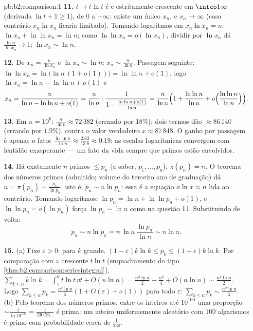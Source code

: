 \begin{solution}{pb:b2:comparison:1}
\textbf{11.} $t \mapsto t\ln t$ é  e estritamente
crescente em $\intco1\infty$ (derivada $\ln t + 1 \geq 1$),
de $0$ a $+\infty$: existe um único $x_n$, e $x_n \to
\infty$ (caso contrário $x_n\ln x_n$ ficaria limitado). Tomando
logaritmos em $x_n\ln x_n = n$: $\ln x_n + \ln\ln x_n = \ln n$;
como $\ln\ln x_n = o(\ln x_n)$, dividir por $\ln x_n$ dá
$\frac{\ln n}{\ln x_n} \to 1$: $\ln x_n \sim \ln n$.

\textbf{12.} De $x_n = \frac{n}{\ln x_n}$ e $\ln x_n \sim
\ln n$: $x_n \sim \frac{n}{\ln n}$. Passagem seguinte: $\ln\ln x_n =
\ln\bigl(\ln n\,(1 + o(1))\bigr) = \ln\ln n + o(1)$, logo $\ln
x_n = \ln n - \ln\ln n + o(1)$ e
\[
x_n = \frac{n}{\ln n - \ln\ln n + o(1)}
= \frac{n}{\ln n}\cdot\frac{1}{1 - \frac{\ln\ln n +
o(1)}{\ln n}}
= \frac{n}{\ln n}\Bigl(1 + \frac{\ln\ln n}{\ln n} +
o\Bigl(\frac{\ln\ln n}{\ln n}\Bigr)\Bigr).
\]

\textbf{13.} Em $n = 10^6$: $\frac{n}{\ln n} \approx 72\,382$
(errando por $18\%$); dois termos dão $\approx 86\,140$ (errando por
$1.9\%$), contra o valor verdadeiro $x \approx 87\,848$. O ganho por
passagem é apenas o fator $\frac{\ln\ln n}{\ln n} \approx
\frac{2.63}{13.8} \approx 0.19$: as escalas logarítmicas convergem
com lentidão exasperante --- um fato da vida sempre que primos estão
envolvidos.

\textbf{14.} Há exatamente $n$ primos $\leq p_n$ (a saber,
$p_1, \dots, p_n$): $\pi(p_n) = n$. O teorema dos números primos
(admitido; volume do terceiro ano de graduação) dá $n = \pi(p_n) \sim
\frac{p_n}{\ln p_n}$, isto é, $p_n \sim n\ln p_n$: essa é a
equação $x\ln x \approx n$ lida ao contrário. Tomando logaritmos:
$\ln p_n = \ln n + \ln\ln p_n + o(1)$, e $\ln\ln p_n =
o(\ln p_n)$ força $\ln p_n \sim \ln n$ como na questão 11.
Substituindo de volta:
\[
p_n \sim n\ln p_n = n\,\ln n\,\frac{\ln p_n}{\ln n} \sim n\ln
n .
\]

\textbf{15.} (a) Fixe $\varepsilon > 0$; para $k$ grande, $(1 -
\varepsilon)k\ln k \leq p_k \leq (1 + \varepsilon)k\ln k$. Por
comparação com a crescente $t\ln t$
(enquadramento do tipo \cref{thm:b2:comparison:seriesintegral}),
$\sum_{k\leq n}k\ln k = \int_1^n t\ln t\,\dd t + O(n\ln n) =
\frac{n^2\ln n}2 - \frac{n^2}4 + O(n\ln n) \sim
\frac{n^2\ln n}2$. Logo $\sum_{k\leq n}p_k = \frac{n^2\ln
n}{2}(1 + O(\varepsilon) + o(1))$ para todo $\varepsilon$:
$\sum_{k\leq n}p_k \sim \frac{n^2\ln n}2$. (b) Pelo teorema dos números
primos, entre os inteiros até $10^{100}$ uma
proporção $\sim \frac{1}{\ln 10^{100}} = \frac1{230.26\dots}$
é prima: um inteiro uniformemente aleatório com $100$ algarismos é primo
com probabilidade cerca de $\frac1{230}$.


\end{solution}
